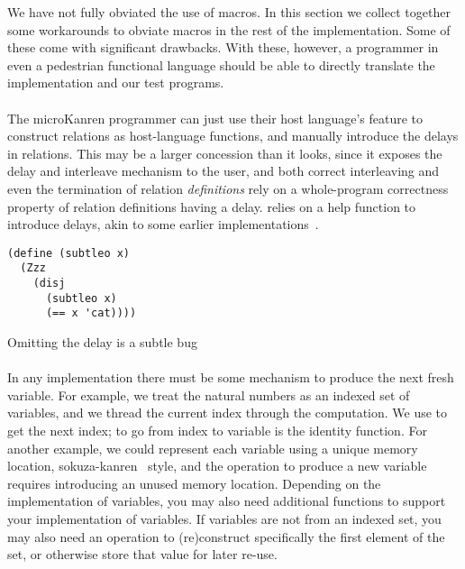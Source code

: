 \documentclass[sigplan,draft,balance,pbalance,natbib=false]{acmart}
\begin{document}
We have not fully obviated the use of macros. In this section we
collect together some workarounds to obviate macros in the rest of the
implementation. Some of these come with significant drawbacks. With
these, however, a programmer in even a pedestrian functional language
should be able to directly translate the implementation and our test
programs.

\paragraph{}

The microKanren programmer can just
use their host language's  feature to construct
relations as host-language functions, and manually introduce the
delays in relations. This may be a larger concession than it looks,
since it exposes the delay and interleave mechanism to the user, and
both correct interleaving and even the termination of relation
\emph{definitions} rely on a whole-program correctness property of
relation definitions having a delay.  relies on a
help function  to introduce delays, akin to some
earlier implementations~\cite{hemann2013muKanren}.

\begin{listing}
  \begin{verbatim}
(define (subtleo x)
  (Zzz
    (disj
      (subtleo x)
      (== x 'cat))))
  \end{verbatim}
  \caption{Omitting the delay is a subtle bug}
  \label{mnt:subtleo}
\end{listing}

\paragraph{}

In any implementation there must be
some mechanism to produce the next fresh variable. For example, we
treat the natural numbers as an indexed set of variables, and we
thread the current index through the computation. We use
 to get the next index; to go from index to variable
is the identity function. For another example, we could represent each
variable using a unique memory location,
sokuza-kanren~\cite{kiselyov2006taste} style, and the operation to
produce a new variable requires introducing an unused memory location.
Depending on the implementation of variables, you may also need
additional functions to support your implementation of variables. If
variables are not from an indexed set, you may also need an operation
to (re)construct specifically the first element of the set, or
otherwise store that value for later re-use.
\end{document}
